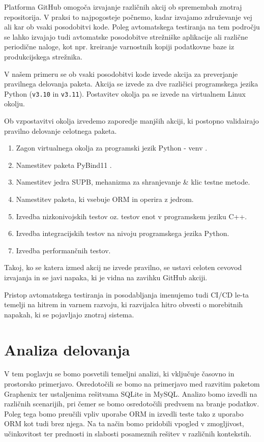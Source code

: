 \documentclass[a4paper,12pt,openright]{book}
\begin{document}
   Platforma GitHub omogoča izvajanje različnih akcij ob spremembah znotraj repositorija. V praksi to najpogosteje počnemo, kadar izvajamo združevanje vej ali kar ob vsaki posodobitvi kode. Poleg avtomatskega testiranja na tem področju se lahko izvajajo tudi avtomatske posodobitve strežniške aplikacije ali različne periodične naloge, kot npr. kreiranje varnostnih kopiji podatkovne baze iz produkcijskega strežnika.

   V našem primeru se ob vsaki posodobitvi kode izvede akcija za preverjanje pravilnega delovanja paketa. Akcija se izvede za dve različici programskega jezika Python ({\tt v3.10} in {\tt v3.11}). Postavitev okolja pa se izvede na virtualnem Linux okolju.

   Ob vzpostavitvi okolja izvedemo zaporedje manjših akciji, ki postopno validairajo pravilno delovanje celotnega paketa.
   \begin{enumerate}
       \item Zagon virtualnega okolja za programski jezik Python - venv \cite{wang2022smartpip}.
       \item Namestitev paketa PyBind11 \cite{PYBIND11_GITHUB}.
       \item Namestitev jedra SUPB, mehanizma za shranjevanje \& klic testne metode.
       \item Namestitev paketa, ki vsebuje ORM in operira z jedrom.
       \item Izvedba nizkonivojskih testov oz. testov enot v programskem jeziku C++.
       \item Izvedba integracijskih testov na nivoju programskega jezika Python.
       \item Izvedba performančnih testov.
   \end{enumerate}

    \noindent
   Takoj, ko se katera izmed akcij ne izvede pravilno, se ustavi celoten cevovod izvajanja in se javi napaka, ki je vidna na zavihku GitHub akciji.

   Pristop avtomatskega testiranja in posodabljanja imenujemo tudi CI/CD le-ta temelji na hitrem in varnem razvoju, ki razvijalca hitro obvesti o morebitnih napakah, ki se pojavljajo znotraj sistema.
    
\chapter{Analiza delovanja}
\label{ch2}

    V tem poglavju se bomo posvetili temeljni analizi, ki vključuje časovno in prostorsko primerjavo. Osredotočili se bomo na primerjavo med razvitim paketom Graphenix ter ustaljenima rešitvama SQLite in MySQL. Analizo bomo izvedli na različnih scenarijih, pri čemer se bomo osredotočili predvsem na branje podatkov. Poleg tega bomo preučili vpliv uporabe ORM in izvedli teste tako z uporabo ORM kot tudi brez njega. Na ta način bomo pridobili vpogled v zmogljivost, učinkovitost ter prednosti in slabosti posameznih rešitev v različnih kontekstih.
\end{document}
